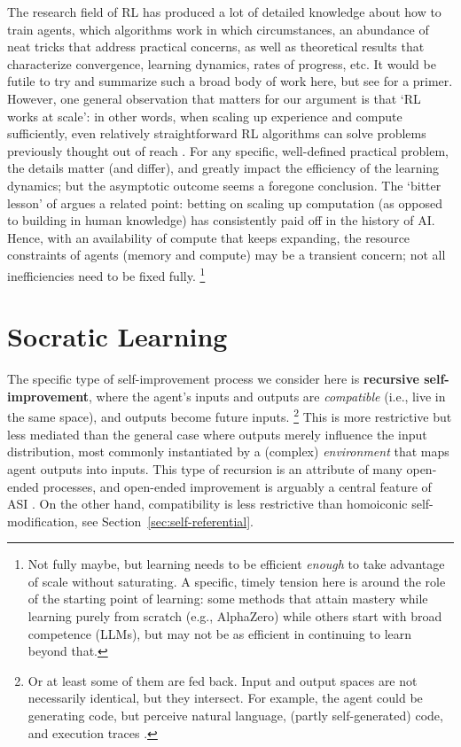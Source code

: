 \documentclass[dvipsnames]{article} %
\begin{document}
The research field of RL has produced a lot of detailed knowledge about how to train agents, which algorithms work in which circumstances, an abundance of neat tricks that address practical concerns, as well as theoretical results that characterize convergence, learning dynamics, rates of progress, etc.
It would be futile to try and summarize such a broad body of work here, but see \citet{patterson2023empirical} for a primer.
However, one general observation that matters for our argument is that `RL works at scale': in other words, when scaling up experience and compute sufficiently, even relatively straightforward RL algorithms can solve problems previously thought out of reach \citep[high-profile examples include:][]{tesauro1995temporal,mnih2015human,alphago,alphazero,alphastar,alphaproof-blog}.
For any specific, well-defined practical problem, the details matter (and differ), and greatly impact the efficiency of the learning dynamics; but the asymptotic outcome seems a foregone conclusion. 
The `bitter lesson' of \citet{sutton2019bitter} argues a related point: betting on scaling up computation (as opposed to building in human knowledge) has consistently paid off in the history of AI. 
Hence, with an availability of compute that keeps expanding, the resource constraints of agents (memory and compute) may be a transient concern; not all inefficiencies need to be fixed fully.%
\footnote{Not fully maybe, but learning needs to be efficient \emph{enough} to take advantage of scale without saturating. A specific, timely tension here is around the role of the starting point of learning: some methods that attain mastery while learning purely from scratch (e.g., AlphaZero) while others start with broad competence (LLMs), but may not be as efficient in continuing to learn beyond that.}

\section{Socratic Learning}
The specific type of self-improvement process we consider here is {\bf recursive self-improvement}, where the agent's inputs and outputs are \emph{compatible} (i.e., live in the same space), and outputs become future inputs.%
\footnote{Or at least some of them are fed back. Input and output spaces are not necessarily identical, but they intersect. For example, the agent could be generating code, but perceive natural language, (partly self-generated) code, and execution traces \citep{NEURIPS2023_4b175d84}.
}
This is more restrictive but less mediated than the general case where outputs merely influence the input distribution, most commonly instantiated by a (complex) \emph{environment} that maps agent outputs into inputs.
This type of recursion is an attribute of many open-ended processes, and open-ended improvement is arguably a central feature of ASI \citep[see][]{hughes2024open}.
On the other hand, compatibility is less restrictive than homoiconic self-modification, see Section~\ref{sec:self-referential}.
\end{document}
